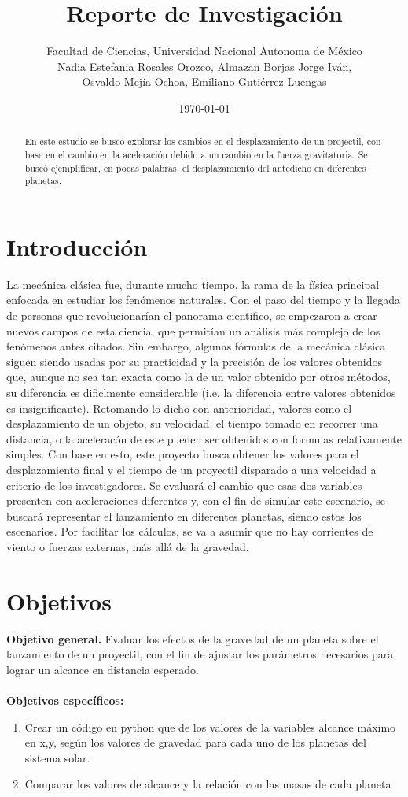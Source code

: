 \documentclass{article}
\title{Reporte de Investigación}
\author{Facultad de Ciencias, Universidad Nacional Autonoma de México\\
Nadia Estefania Rosales Orozco, Almazan Borjas Jorge Iv\'an,\\ Osvaldo Mej\'ia Ochoa, Emiliano Guti\'errez Luengas}
\date{\today}
\begin{document}
\maketitle

\begin{abstract}
  En este estudio se buscó explorar los cambios en el desplazamiento de un projectil, con base en el cambio en la aceleración debido a un cambio en la fuerza gravitatoria. Se buscó ejemplificar, en pocas palabras, el desplazamiento del antedicho en diferentes planetas.
\end{abstract}


\section{Introducci\'on}
La mec\'anica cl\'asica fue, durante mucho tiempo, la rama de la f\'isica principal enfocada en estudiar los fen\'omenos naturales. Con el paso del tiempo y la llegada de personas que revolucionar\'ian el panorama cient\'ifico, se empezaron a crear nuevos campos de esta ciencia, que permit\'ian un an\'alisis m\'as complejo de los fen\'omenos antes citados. Sin embargo, algunas f\'ormulas de la mec\'anica cl\'asica siguen siendo usadas por su practicidad y la precisi\'on de los valores obtenidos que, aunque no sea tan exacta como la de un valor obtenido por otros m\'etodos, su diferencia es dificlmente considerable (i.e. la diferencia entre valores obtenidos es insignificante).
Retomando lo dicho con anterioridad, valores como el desplazamiento de un objeto, su velocidad, el tiempo tomado en recorrer una distancia, o la acelerac\'on de este pueden ser obtenidos con formulas relativamente simples. Con base en esto, este proyecto busca obtener los valores para el desplazamiento final y el tiempo de un proyectil disparado a una velocidad a criterio de los investigadores. Se evaluará el cambio que esas dos variables presenten con aceleraciones diferentes y, con el fin de simular este escenario, se buscar\'a representar el lanzamiento en diferentes planetas, siendo estos los escenarios.
Por facilitar los c\'alculos, se va a asumir que no hay corrientes de viento o fuerzas externas, m\'as all\'a de la gravedad.


\section{Objetivos}
\textbf{Objetivo general.} Evaluar los efectos de la gravedad de un planeta sobre el lanzamiento de un proyectil, con el fin de ajustar los parámetros necesarios para lograr un alcance en distancia esperado.\\ \\
\textbf{Objetivos específicos:} 
\begin{enumerate}
    \item Crear un código en python que de los valores de la variables alcance máximo en x,y, según los valores de gravedad para cada uno de los planetas del sistema solar.
    \item Comparar los valores de alcance y la relación con las masas de cada planeta
\end{enumerate}
\end{document}
